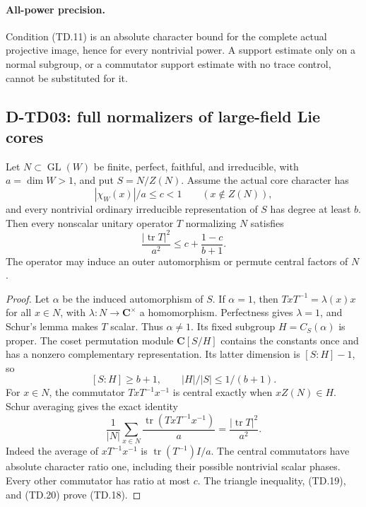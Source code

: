 \paragraph{All-power precision.}
Condition (TD.11) is an absolute character bound for the complete
actual projective image, hence for every nontrivial power.
A support estimate only on a normal subgroup, or a commutator
support estimate with no trace control, cannot be substituted for it.

\subsection{D-TD03: full normalizers of large-field Lie cores}

\begin{lemma}
Let \(N\subset\operatorname{GL}(W)\) be finite, perfect, faithful,
and irreducible, with \(a=\dim W>1\), and put \(S=N/Z(N)\).
Assume the actual core character has
\[
                  |\chi_W(x)|/a\le c<1\qquad(x\notin Z(N)),
                  \tag{TD.17}
\]
and every nontrivial ordinary irreducible representation of \(S\)
has degree at least \(b\).
Then every nonscalar unitary operator \(T\) normalizing \(N\)
satisfies
\[
 \frac{|\operatorname{tr}T|^2}{a^2}
                   \le c+\frac{1-c}{b+1}.
                   \tag{TD.18}
\]
The operator may induce an outer automorphism or permute central
factors of \(N\).
\end{lemma}

\begin{proof}
Let \(\alpha\) be the induced automorphism of \(S\).
If \(\alpha=1\), then
\(TxT^{-1}=\lambda(x)x\) for all \(x\in N\), with
\(\lambda:N\longrightarrow\mathbf C^\times\) a homomorphism.
Perfectness gives \(\lambda=1\), and Schur's lemma makes \(T\)
scalar.  Thus \(\alpha\ne1\).
Its fixed subgroup \(H=C_S(\alpha)\) is proper.
The coset permutation module \(\mathbf C[S/H]\) contains the
constants once and has a nonzero complementary representation.
Its latter dimension is \([S:H]-1\), so
\[
                 [S:H]\ge b+1,\qquad |H|/|S|\le1/(b+1).
                 \tag{TD.19}
\]
For \(x\in N\), the commutator \(TxT^{-1}x^{-1}\) is central
exactly when \(xZ(N)\in H\).
Schur averaging gives the exact identity
\[
 \frac1{|N|}\sum_{x\in N}
       \frac{\operatorname{tr}(TxT^{-1}x^{-1})}{a}
                         =\frac{|\operatorname{tr}T|^2}{a^2}.
                         \tag{TD.20}
\]
Indeed the average of \(xT^{-1}x^{-1}\) is
\(\operatorname{tr}(T^{-1})I/a\).
The central commutators have absolute character ratio one,
including their possible nontrivial scalar phases.
Every other commutator has ratio at most \(c\).
The triangle inequality, (TD.19), and (TD.20) prove (TD.18).
\end{proof}

